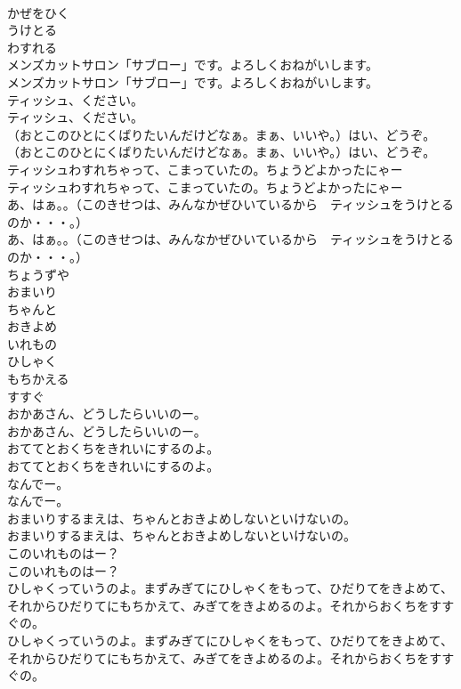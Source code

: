 \documentclass[8pt]{extreport}
\begin{document}
\begin{CJK}{UTF8}{min}
\\	かぜをひく
\\	うけとる
\\	わすれる
\\	メンズカットサロン「サブロー」です。よろしくおねがいします。
\\	メンズカットサロン「サブロー」です。よろしくおねがいします。
\\	ティッシュ、ください。
\\	ティッシュ、ください。
\\	（おとこのひとにくばりたいんだけどなぁ。まぁ、いいや。）はい、どうぞ。
\\	（おとこのひとにくばりたいんだけどなぁ。まぁ、いいや。）はい、どうぞ。
\\	ティッシュわすれちゃって、こまっていたの。ちょうどよかったにゃー
\\	ティッシュわすれちゃって、こまっていたの。ちょうどよかったにゃー
\\	あ、はぁ。。（このきせつは、みんなかぜひいているから　ティッシュをうけとるのか・・・。）
\\	あ、はぁ。。（このきせつは、みんなかぜひいているから　ティッシュをうけとるのか・・・。）
\\	ちょうずや
\\	おまいり
\\	ちゃんと
\\	おきよめ
\\	いれもの
\\	ひしゃく
\\	もちかえる
\\	すすぐ
\\	おかあさん、どうしたらいいのー。
\\	おかあさん、どうしたらいいのー。
\\	おててとおくちをきれいにするのよ。
\\	おててとおくちをきれいにするのよ。
\\	なんでー。
\\	なんでー。
\\	おまいりするまえは、ちゃんとおきよめしないといけないの。
\\	おまいりするまえは、ちゃんとおきよめしないといけないの。
\\	このいれものはー？
\\	このいれものはー？
\\	ひしゃくっていうのよ。まずみぎてにひしゃくをもって、ひだりてをきよめて、それからひだりてにもちかえて、みぎてをきよめるのよ。それからおくちをすすぐの。
\\	ひしゃくっていうのよ。まずみぎてにひしゃくをもって、ひだりてをきよめて、それからひだりてにもちかえて、みぎてをきよめるのよ。それからおくちをすすぐの。

\end{CJK}
\end{document}
